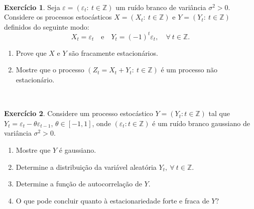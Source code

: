 \documentclass[
  11pt,
  a4paper,
]{book}
\theoremstyle{definition}
\theoremstyle{definition}
\theoremstyle{definition}
\newtheorem{exercise}{Exercício}[chapter]
\theoremstyle{definition}
\theoremstyle{remark}
\begin{document}
\(\,\)

\begin{exercise}

Seja \(\varepsilon = (\varepsilon_t: ~t \in \mathbb{Z})\) um ruído branco de variância \(\sigma^2 > 0\). Considere os processos estocásticos \(X = (X_t: ~ t \in \mathbb{Z})\) e \(Y = (Y_t: ~ t \in \mathbb{Z})\) definidos do seguinte modo:
\[X_t = \varepsilon_t \quad \text{e} \quad Y_t = (-1)^t \varepsilon_t, \quad \forall ~ t \in \mathbb{Z}.\]

\begin{enumerate}
\def\labelenumi{(\alph{enumi})}
\item
  Prove que \(X\) e \(Y\) são fracamente estacionários.
\item
  Mostre que o processo \((Z_t = X_t + Y_t: ~  t \in \mathbb{Z})\) é um processo não estacionário.
\end{enumerate}

\end{exercise}

\(\,\)

\begin{exercise}

Considere um processo estocástico \(Y = (Y_t: t \in \mathbb{Z})\) tal que \(Y_t = \varepsilon_t - \theta \varepsilon_{t-1}\), \(\theta \in [-1,1]\), onde \((\varepsilon_t: t \in \mathbb{Z})\) é um ruído branco gaussiano de variância \(\sigma^2 > 0\).

\begin{enumerate}
\def\labelenumi{(\alph{enumi})}
\item
  Mostre que \(Y\) é gaussiano.
\item
  Determine a distribuição da variável aleatória \(Y_t, ~\forall ~t \in \mathbb{Z}\).
\item
  Determine a função de autocorrelação de \(Y\).
\item
  O que pode concluir quanto à estacionariedade forte e fraca de \(Y\)?
\end{enumerate}

\end{exercise}

\(\,\)
\end{document}
